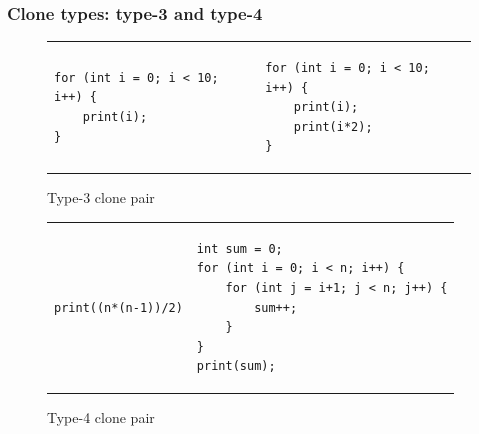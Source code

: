 \documentclass[aspectratio=1610, xcolor=table]{beamer}
\begin{document}
\begin{frame}[fragile]
	\frametitle{Clone types: type-3 and type-4}
    \vspace{0.5cm}
	\begin{figure}[t]
		\begin{center}
			\begin{tabular}{p{6cm} | p{6cm}}
				\begin{lstlisting}
for (int i = 0; i < 10; i++) {
    print(i);
}\end{lstlisting} &
				\begin{lstlisting}
for (int i = 0; i < 10; i++) {
    print(i);
    print(i*2);
}\end{lstlisting}
			\end{tabular}
		\end{center}
		\caption{Type-3 clone pair}
		\label{fig:type3clone}
	\end{figure}
    \vspace{-0.5cm}

	\begin{figure}[t]
		\begin{center}
			\begin{tabular}{r | p{6.5cm}}
				\hspace{3.2cm}\begin{lstlisting}
print((n*(n-1))/2)
\end{lstlisting} &
				\begin{lstlisting}
int sum = 0;
for (int i = 0; i < n; i++) {
    for (int j = i+1; j < n; j++) {
        sum++;
    }
}
print(sum);
            \end{lstlisting}
			\end{tabular}
		\end{center}
		\caption{Type-4 clone pair}
		\label{fig:type4clone}
	\end{figure}
\end{frame}
\end{document}
